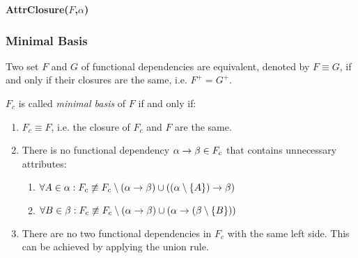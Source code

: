 \begin{algorithm}
\caption*{\bf AttrClosure($F$,$\alpha$)}
\begin{algorithmic}
\STATE{$\alpha^+ := \alpha$}
		\IF{$\beta \subseteq \alpha^+$}
			\STATE{$\alpha^+ := \alpha^+ \cup \gamma$}
		\ENDIF
	\ENDFOR
\ENDWHILE
\RETURN{$\alpha^+$}
\end{algorithmic}
\end{algorithm}




\subsubsection{Minimal Basis}

Two set $F$ and $G$ of functional dependencies are equivalent, denoted by $F \equiv G$, if and only if their closures are the same, i.e. $F^+ = G^+$.

$F_c$ is called \emph{minimal basis} of $F$ if and only if:
\begin{enumerate}
\item $F_c \equiv F$, i.e. the closure of $F_c$ and $F$ are the same.
\item There is no functional dependency $\alpha \rightarrow \beta \in F_c$ that contains unnecessary attributes:
	\begin{enumerate}
	\item $\forall A \in \alpha : F_c \not\equiv F_c \setminus (\alpha \rightarrow \beta) \cup ((\alpha \setminus \{A\}) \rightarrow \beta)$
	\item $\forall B \in \beta : F_c \not\equiv F_c \setminus (\alpha \rightarrow \beta) \cup (\alpha \rightarrow (\beta \setminus \{ B \}))$
	\end{enumerate}
\item There are no two functional dependencies in $F_c$ with the same left side. This can be achieved by applying the union rule.
\end{enumerate}

